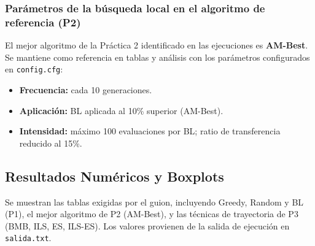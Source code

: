 \subsubsection*{Parámetros de la búsqueda local en el algoritmo de referencia (P2)}

El mejor algoritmo de la Práctica 2 identificado en las ejecuciones es \textbf{AM-Best}. Se mantiene como referencia en tablas y análisis con los parámetros configurados en \texttt{config.cfg}:

\begin{itemize}
    \item \textbf{Frecuencia:} cada 10 generaciones.
    \item \textbf{Aplicación:} BL aplicada al 10\% superior (AM-Best).
    \item \textbf{Intensidad:} máximo 100 evaluaciones por BL; ratio de transferencia reducido al 15\%.
\end{itemize}

\subsection{Resultados Numéricos y Boxplots}

Se muestran las tablas exigidas por el guion, incluyendo Greedy, Random y BL (P1), el mejor algoritmo de P2 (AM-Best), y las técnicas de trayectoria de P3 (BMB, ILS, ES, ILS-ES). Los valores provienen de la salida de ejecución en \texttt{salida.txt}.

\begin{table}[H]
\centering
\caption{Resultados numéricos -- IBEX 35}
\label{tab:global-ibex35}
\end{table}

